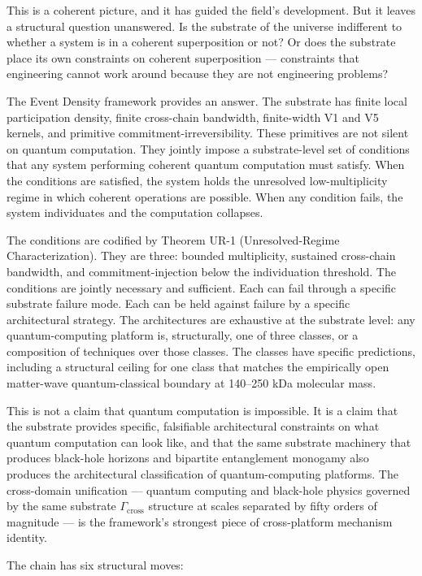 \documentclass[11pt,a4paper]{article}
\begin{document}
This is a coherent picture, and it has guided the field's development. But it leaves a structural question unanswered. Is the substrate of the universe indifferent to whether a system is in a coherent superposition or not? Or does the substrate place its own constraints on coherent superposition --- constraints that engineering cannot work around because they are not engineering problems?

The Event Density framework provides an answer. The substrate has finite local participation density, finite cross-chain bandwidth, finite-width V1 and V5 kernels, and primitive commitment-irreversibility. These primitives are not silent on quantum computation. They jointly impose a substrate-level set of conditions that any system performing coherent quantum computation must satisfy. When the conditions are satisfied, the system holds the unresolved low-multiplicity regime in which coherent operations are possible. When any condition fails, the system individuates and the computation collapses.

The conditions are codified by Theorem UR-1 (Unresolved-Regime Characterization). They are three: bounded multiplicity, sustained cross-chain bandwidth, and commitment-injection below the individuation threshold. The conditions are jointly necessary and sufficient. Each can fail through a specific substrate failure mode. Each can be held against failure by a specific architectural strategy. The architectures are exhaustive at the substrate level: any quantum-computing platform is, structurally, one of three classes, or a composition of techniques over those classes. The classes have specific predictions, including a structural ceiling for one class that matches the empirically open matter-wave quantum-classical boundary at 140--250 kDa molecular mass.

This is not a claim that quantum computation is impossible. It is a claim that the substrate provides specific, falsifiable architectural constraints on what quantum computation can look like, and that the same substrate machinery that produces black-hole horizons and bipartite entanglement monogamy also produces the architectural classification of quantum-computing platforms. The cross-domain unification --- quantum computing and black-hole physics governed by the same substrate $\Gamma_{\mathrm{cross}}$ structure at scales separated by fifty orders of magnitude --- is the framework's strongest piece of cross-platform mechanism identity.

The chain has six structural moves:
\end{document}
